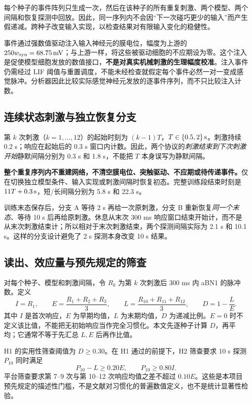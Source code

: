 每个种子的事件阵列只生成一次，然后在该种子的所有重复刺激、两个模型、两个间隔和恢复探测中回放。因此，同一序列内不会因“下一次碰巧更少的输入”而产生假递减。跨种子改变输入实现，以检查结果对有限输入变化的稳健性。

事件通过强数值驱动注入输入神经元的膜电位，幅度为上游的 $250w_{\mathrm{syn}}=68.75\,\mathrm{mV}$；与上游一样，将这些被驱动细胞的不应期设为零。这个注入是促使模型细胞发放的数值接口，\textbf{不是对真实机械刺激的生理幅度校准}。注入事件仍需经过 LIF 阈值与重置调度，不能未经检查就假定每个事件必然一对一变成感觉脉冲。分析器因此比较实际感觉神经元发放的逐事件序列，而不只比较注入计数。

\subsection{连续状态刺激与独立恢复分支}
\label{sec:protocol}
第 $k$ 次刺激（$k=1,\ldots,12$）的起始时刻为 $(k-1)T$，$T\in\{0.5,2\}\,\mathrm{s}$。刺激持续 0.2 s；响应在起始后的 0.3 s 窗口内计数。因此，两个协议的\emph{刺激结束到下次刺激开始}静默间隔分别为 0.3 s 和 1.8 s，不能把 $T$ 本身误写为静默间隔。

\textbf{整个重复序列内不重建网络，不清空膜电位、突触驱动、不应期或待传递事件。}仅在切换独立模型条件、输入实现或刺激间隔时恢复初态。完整训练段结束时刻是 $11T+0.3\,\mathrm{s}$，短/长间隔分别为 5.8 s 和 22.3 s。

训练末态保存后，分支 A 等待 2 s 再给一次原刺激，分支 B 重新恢复\emph{同一个末态}、等待 10 s 后再给原刺激。休息从末次 300 ms 响应窗口结束开始计，而不是从末次刺激结束计；所以相对于末次刺激结束，两个探测间隔实际为 2.1 s 和 10.1 s。这样的分支设计避免了 2 s 探测本身改变 10 s 结果。

\subsection{读出、效应量与预先规定的筛查}
\label{sec:metrics}
对每个种子、模型和刺激间隔，令 $R_k$ 为第 $k$ 次刺激后 300 ms 内 aBN1 的脉冲数。定义
\begin{equation}
I=R_1,\qquad E=\frac{R_1+R_2+R_3}{3},\qquad
L=\frac{R_{10}+R_{11}+R_{12}}{3},\qquad
D=1-\frac{L}{E}.\label{eq:D}
\end{equation}
其中 $I$ 是首次响应，$E$ 为早期均值，$L$ 为末期均值，$D$ 为递减比例。$E=0$ 时不定义该比值，不能把无初始响应当作完全习惯化。本文先逐种子计算 $D$，再平均；它通常不等于先汇总 $L,E$ 后再作比值。

H1 的实用性筛查阈值为 $D\geq0.30$。在 H1 通过的前提下，H2 筛查要求 10 s 探测 $P_{10}$ 同时满足
\begin{equation}
P_{10}-L\geq0.20E,\qquad P_{10}\geq0.80I.\label{eq:H2}
\end{equation}
平台筛查要求第 7--9 次与第 10--12 次响应均值之差不超过 $0.10E$。这些是本项目预先规定的描述性门槛，不是文献对习惯化的普遍数值定义，也不是统计显著性检验。

